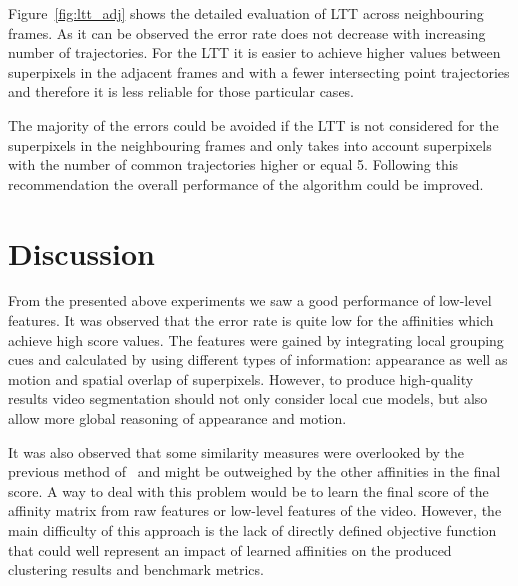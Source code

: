 Figure~\ref{fig:ltt_adj} shows the detailed evaluation of LTT across neighbouring frames.
As it can be observed the error rate does not decrease with increasing number of trajectories. 
For the LTT it is easier to achieve higher values between superpixels in the adjacent frames and with a fewer intersecting point trajectories and therefore it is less reliable for those particular cases. 

The majority of the errors could be avoided if the LTT is not considered for the superpixels in the neighbouring frames and only takes into account superpixels with the number of common trajectories higher or equal 5.
Following this recommendation the overall performance of the algorithm could be improved.
\section{Discussion}
\label{ch3:disc}
From the presented above experiments we saw a good performance of low-level features. It was observed that the error rate is quite low for the affinities which achieve high score values. 
The features were gained by integrating local grouping cues and calculated by using different types of information: appearance as well as motion and spatial overlap of superpixels.
However, to produce high-quality results video segmentation should not only consider local cue models, but also allow more global reasoning of appearance and motion.

It was also observed that some similarity measures were overlooked by the previous method of~\cite{GalassoCS12} and might be outweighed by the other affinities in the final score.
A way to deal with this problem would be to learn the final score of the affinity matrix from raw features or low-level features of the video. However, the main difficulty
of this approach is the lack of directly defined objective function that could well represent an impact of learned affinities on the produced clustering results and benchmark metrics.
